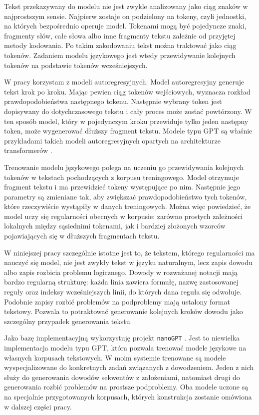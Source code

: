 \documentclass[shortabstract]{iithesis}
\theoremstyle{definition}
\theoremstyle{remark}
\theoremstyle{plain}
\begin{document}
Tekst przekazywany do modelu nie jest zwykle analizowany jako ciąg znaków w
najprostszym sensie. Najpierw zostaje on podzielony na tokeny, czyli jednostki,
na których bezpośrednio operuje model. Tokenami mogą być pojedyncze znaki,
fragmenty słów, całe słowa albo inne fragmenty tekstu zależnie od przyjętej
metody kodowania. Po takim zakodowaniu tekst można traktować jako ciąg tokenów.
Zadaniem modelu językowego jest wtedy przewidywanie kolejnych tokenów na podstawie
tokenów wcześniejszych.

W pracy korzystam z modeli autoregresyjnych. Model autoregresyjny generuje tekst
krok po kroku. Mając pewien ciąg tokenów wejściowych, wyznacza rozkład
prawdopodobieństwa następnego tokenu. Następnie wybrany token jest dopisywany do
dotychczasowego tekstu i cały proces może zostać powtórzony. W ten sposób model,
który w pojedynczym kroku przewiduje tylko jeden następny token, może wygenerować
dłuższy fragment tekstu. Modele typu GPT są właśnie przykładami takich modeli
autoregresyjnych opartych na architekturze transformerów
\cite{vaswani2017attention,radford2019language}.

Trenowanie modelu językowego polega na uczeniu go przewidywania kolejnych tokenów
w tekstach pochodzących z korpusu treningowego. Model otrzymuje fragment tekstu
i ma przewidzieć tokeny występujące po nim. Następnie jego parametry są zmieniane
tak, aby zwiększać prawdopodobieństwo tych tokenów, które rzeczywiście wystąpiły
w danych treningowych. Można więc powiedzieć, że model uczy się regularności
obecnych w korpusie: zarówno prostych zależności lokalnych między sąsiednimi
tokenami, jak i bardziej złożonych wzorców pojawiających się w dłuższych
fragmentach tekstu.

W niniejszej pracy szczególnie istotne jest to, że tekstem, którego regularności
ma nauczyć się model, nie jest zwykły tekst w języku naturalnym, lecz zapis
dowodu albo zapis rozbicia problemu logicznego. Dowody w rozważanej notacji mają
bardzo regularną strukturę: każda linia zawiera formułę, nazwę zastosowanej
reguły oraz indeksy wcześniejszych linii, do których dana reguła się odwołuje.
Podobnie zapisy rozbić problemów na podproblemy mają ustalony format tekstowy.
Pozwala to potraktować generowanie kolejnych kroków dowodu jako szczególny
przypadek generowania tekstu.

Jako bazę implementacyjną wykorzystuję projekt \texttt{nanoGPT}
\cite{karpathy2022nanogpt}. Jest to niewielka implementacja modelu typu GPT,
która pozwala trenować modele językowe na własnych korpusach tekstowych. W moim
systemie trenowane są modele wyspecjalizowane do konkretnych zadań związanych
z dowodzeniem. Jeden z nich służy do generowania dowodów sekwentów z założeniami,
natomiast drugi do generowania rozbić problemów na prostsze podproblemy. Oba
modele uczone są na specjalnie przygotowanych korpusach, których konstrukcja
zostanie omówiona w dalszej części pracy.
\end{document}
